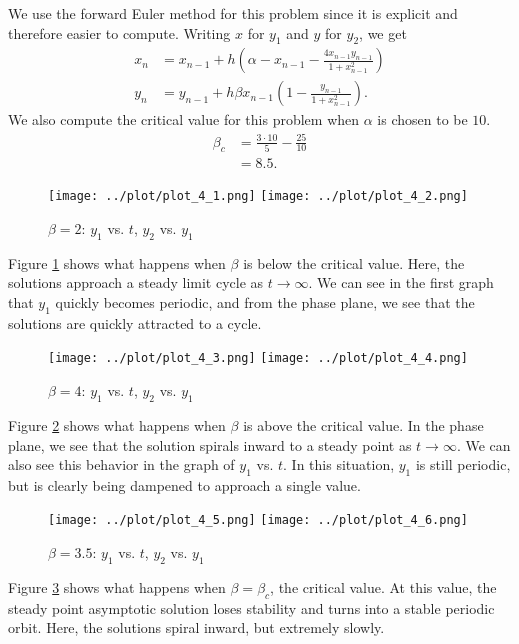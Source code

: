 \begin{solution}
  We use the forward Euler method for this problem since it is explicit and therefore easier to compute. Writing $x$ for $y_1$ and $y$ for $y_2$, we get
  \begin{align*}
    x_n &= x_{n-1} + h\left(\alpha - x_{n-1} - \frac{4 x_{n-1} y_{n-1}}{1 + x_{n-1}^2}\right) \\
    y_n &= y_{n-1} + h \beta x_{n-1} \left(1 - \frac{y_{n-1}}{1 + x_{n-1}^2}\right).
  \end{align*}
  We also compute the critical value for this problem when $\alpha$ is chosen to be $10$.
  \begin{align*}
    \beta_c 
    &= \frac{3\cdot 10}{5} - \frac{25}{10} \\
    &= 8.5.
  \end{align*}
  \begin{figure}[!ht]
    \centering
    \texttt{[image: ../plot/plot\_4\_1.png]}
    \texttt{[image: ../plot/plot\_4\_2.png]}
    \caption{$\beta = 2$: $y_1$ vs. $t$, $y_2$ vs. $y_1$}
    \label{fig:prob4_1}
  \end{figure}
  Figure \ref{fig:prob4_1} shows what happens when $\beta$ is below the critical value. Here, the solutions approach a steady limit cycle as $t \to \infty$. We can see in the first graph that $y_1$ quickly becomes periodic, and from the phase plane, we see that the solutions are quickly attracted to a cycle.
  \begin{figure}[!ht]
    \centering
    \texttt{[image: ../plot/plot\_4\_3.png]}
    \texttt{[image: ../plot/plot\_4\_4.png]}
    \caption{$\beta = 4$: $y_1$ vs. $t$, $y_2$ vs. $y_1$}
    \label{fig:prob4_2}
  \end{figure}
  Figure \ref{fig:prob4_2} shows what happens when $\beta$ is above the critical value. In the phase plane, we see that the solution spirals inward to a steady point as $t \to \infty$. We can also see this behavior in the graph of $y_1$ vs. $t$. In this situation, $y_1$ is still periodic, but is clearly being dampened to approach a single value.
  \begin{figure}[!ht]
    \centering
    \texttt{[image: ../plot/plot\_4\_5.png]}
    \texttt{[image: ../plot/plot\_4\_6.png]}
    \caption{$\beta = 3.5$: $y_1$ vs. $t$, $y_2$ vs. $y_1$}
    \label{fig:prob4_3}
  \end{figure}
  Figure \ref{fig:prob4_3} shows what happens when $\beta = \beta_c$, the critical value. At this value, the steady point asymptotic solution loses stability and turns into a stable periodic orbit. Here, the solutions spiral inward, but extremely slowly.
\end{solution}
